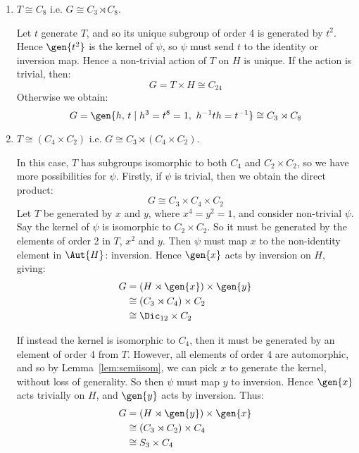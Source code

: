 \begin{enumerate}
    \item \(T \cong C_8\) i.e. \(G \cong C_3 \rtimes C_8\).

        Let \(t\) generate \(T\), and so its unique subgroup of order 4 is generated by \(t^2\).
        Hence \(\gen{t^2}\) is the kernel of \(\psi\), so \(\psi\) must send \(t\) to the identity or
        inversion map.
        Hence a non-trivial action of \(T\) on \(H\) is unique.
        If the action is trivial, then:
        \[G = T \times H \cong C_{24}\]
        Otherwise we obtain:
        \[G = \gen{h,\,t \mid h^3 = t^8 = 1,\ h^{-1}th = t^{-1}} \cong C_3 \rtimes C_8\]

    \item \(T \cong (C_4 \times C_2)\) i.e. \(G \cong C_3 \rtimes (C_4 \times C_2)\).

        In this case, \(T\) has subgroups isomorphic to both \(C_4\) and \(C_2 \times C_2\), so we have more
        possibilities for \(\psi\).
        Firstly, if \(\psi\) is trivial, then we obtain the direct product:
        \[G \cong C_3 \times C_4 \times C_2\]
        Let \(T\) be generated by \(x\) and \(y\), where \(x^4 = y^2 = 1\), and consider non-trivial \(\psi\).
        Say the kernel of \(\psi\) is isomorphic to \(C_2 \times C_2\).
        So it must be generated by the elements of order 2 in \(T\), \(x^2\) and \(y\).
        Then \(\psi\) must map \(x\) to the non-identity element in \(\Aut{H}\): inversion.
        Hence \(\gen{x}\) acts by inversion on \(H\), giving:
        \begin{equation*}
        \begin{aligned}
            G &= (H \rtimes \gen{x}) \times \gen{y} \\
            &\cong (C_3 \rtimes C_4) \times C_2 \\
            &\cong \Dic_{12} \times C_2
        \end{aligned}
        \end{equation*}

        If instead the kernel is isomorphic to \(C_4\), then it must be generated by an element of order 4 from \(T\).
        However, all elements of order 4 are automorphic, and so by Lemma~\ref{lem:semiisom}, we can pick \(x\) to
        generate the kernel, without loss of generality.
        So then \(\psi\) must map \(y\) to inversion.
        Hence \(\gen{x}\) acts trivially on \(H\), and \(\gen{y}\) acts by inversion.
        Thus:
        \begin{equation*}
        \begin{aligned}
            G &= (H \rtimes \gen{y}) \times \gen{x} \\
            &\cong (C_3 \rtimes C_2) \times C_4 \\
            &\cong S_3 \times C_4
        \end{aligned}
        \end{equation*}


\end{enumerate}

